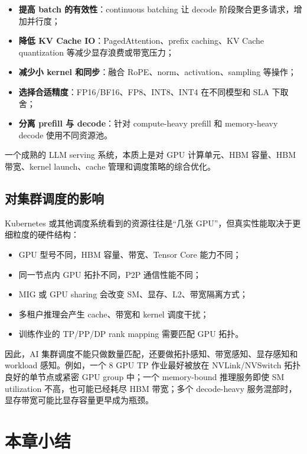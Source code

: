\begin{itemize}
  \item \textbf{提高 batch 的有效性}：continuous batching 让 decode 阶段聚合更多请求，增加并行度；
  \item \textbf{降低 KV Cache IO}：PagedAttention、prefix caching、KV Cache quantization 等减少显存浪费或带宽压力；
  \item \textbf{减少小 kernel 和同步}：融合 RoPE、norm、activation、sampling 等操作；
  \item \textbf{选择合适精度}：FP16/BF16、FP8、INT8、INT4 在不同模型和 SLA 下取舍；
  \item \textbf{分离 prefill 与 decode}：针对 compute-heavy prefill 和 memory-heavy decode 使用不同资源池。
\end{itemize}

一个成熟的 LLM serving 系统，本质上是对 GPU 计算单元、HBM 容量、HBM 带宽、kernel launch、cache 管理和调度策略的综合优化。

\subsection{对集群调度的影响}
\label{subsec:gpu-scheduling-impact}

Kubernetes 或其他调度系统看到的资源往往是“几张 GPU”，但真实性能取决于更细粒度的硬件结构：

\begin{itemize}
  \item GPU 型号不同，HBM 容量、带宽、Tensor Core 能力不同；
  \item 同一节点内 GPU 拓扑不同，P2P 通信性能不同；
  \item MIG 或 GPU sharing 会改变 SM、显存、L2、带宽隔离方式；
  \item 多租户推理会产生 cache、带宽和 kernel 调度干扰；
  \item 训练作业的 TP/PP/DP rank mapping 需要匹配 GPU 拓扑。
\end{itemize}

因此，AI 集群调度不能只做数量匹配，还要做拓扑感知、带宽感知、显存感知和 workload 感知。例如，一个 8 GPU TP 作业最好被放在 NVLink/NVSwitch 拓扑良好的单节点或紧密 GPU group 中；一个 memory-bound 推理服务即使 SM utilization 不高，也可能已经耗尽 HBM 带宽；多个 decode-heavy 服务混部时，显存带宽可能比显存容量更早成为瓶颈。

\section{本章小结}
\label{sec:gpu-architecture-summary}

